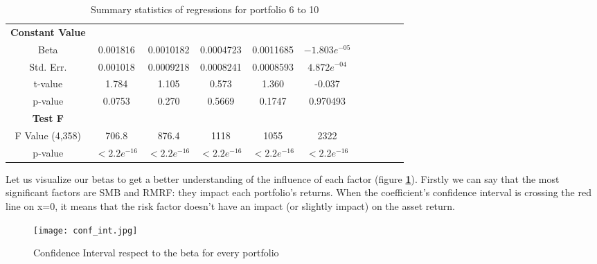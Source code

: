 \documentclass[11pt]{article}
\begin{document}
\begin{table}[H]
\begin{tabular}{ccccccccccc}
    \textbf{Constant Value} \\
    Beta & 0.001816 &  0.0010182 & 0.0004723 &  0.0011685 & $-1.803e^{-05}$ \\
    Std. Err. &  0.001018 & 0.0009218 & 0.0008241  & 0.0008593 &  $4.872e^{-04}$ \\
    t-value & 1.784 & 1.105 & 0.573 & 1.360 & -0.037 \\
    p-value &  0.0753 & 0.270 & 0.5669 & 0.1747 & 0.970493 \\
    \midrule
    \textbf{Test F}  \\
    F Value (4,358) & 706.8 & 876.4 & 1118 & 1055 & 2322 \\
    p-value & $< 2.2e^{-16}$ & $< 2.2e^{-16}$ & $< 2.2e^{-16}$ & $< 2.2e^{-16}$ & $< 2.2e^{-16}$ \\
    \bottomrule
    \bottomrule
    \end{tabular}
    \caption{Summary statistics of regressions for portfolio 6 to 10} 
    \label{tab:summary_reg6_10}
\end{table}
\clearpage

Let us visualize our betas to get a better understanding of the influence of each factor (figure \textbf{\ref{fig:conf_int}}). Firstly we can say that the most significant 
factors are SMB and RMRF: they impact each portfolio’s returns.\newline
When the coefficient’s confidence interval is crossing the red line on x=0, it means that the risk factor doesn’t have an impact (or slightly impact) on the asset return. 
\begin{figure}[H]
    \begin{center}
        \texttt{[image: conf\_int.jpg]}
    \end{center}
    \caption{Confidence Interval respect to the beta for every portfolio}
    \label{fig:conf_int}
\end{figure}
\end{document}
